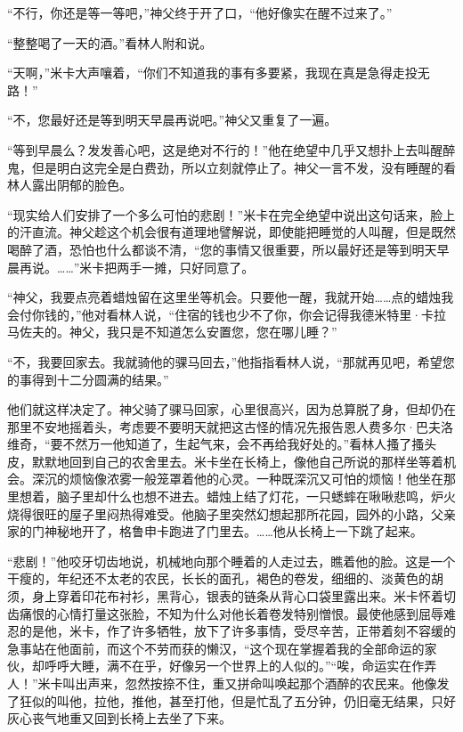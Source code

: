 \par “不行，你还是等一等吧，”神父终于开了口，“他好像实在醒不过来了。”
\par “整整喝了一天的酒。”看林人附和说。
\par “天啊，”米卡大声嚷着，“你们不知道我的事有多要紧，我现在真是急得走投无路！”
\par “不，您最好还是等到明天早晨再说吧。”神父又重复了一遍。
\par “等到早晨么？发发善心吧，这是绝对不行的！”他在绝望中几乎又想扑上去叫醒醉鬼，但是明白这完全是白费劲，所以立刻就停止了。神父一言不发，没有睡醒的看林人露出阴郁的脸色。
\par “现实给人们安排了一个多么可怕的悲剧！”米卡在完全绝望中说出这句话来，脸上的汗直流。神父趁这个机会很有道理地譬解说，即使能把睡觉的人叫醒，但是既然喝醉了酒，恐怕也什么都谈不清，“您的事情又很重要，所以最好还是等到明天早晨再说。……”米卡把两手一摊，只好同意了。
\par “神父，我要点亮着蜡烛留在这里坐等机会。只要他一醒，我就开始……点的蜡烛我会付你钱的，”他对看林人说，“住宿的钱也少不了你，你会记得我德米特里·卡拉马佐夫的。神父，我只是不知道怎么安置您，您在哪儿睡？”
\par “不，我要回家去。我就骑他的骒马回去，”他指指看林人说，“那就再见吧，希望您的事得到十二分圆满的结果。”
\par 他们就这样决定了。神父骑了骒马回家，心里很高兴，因为总算脱了身，但却仍在那里不安地摇着头，考虑要不要明天就把这古怪的情况先报告恩人费多尔·巴夫洛维奇，“要不然万一他知道了，生起气来，会不再给我好处的。”看林人搔了搔头皮，默默地回到自己的农舍里去。米卡坐在长椅上，像他自己所说的那样坐等着机会。深沉的烦恼像浓雾一般笼罩着他的心灵。一种既深沉又可怕的烦恼！他坐在那里想着，脑子里却什么也想不进去。蜡烛上结了灯花，一只蟋蟀在啾啾悲鸣，炉火烧得很旺的屋子里闷热得难受。他脑子里突然幻想起那所花园，园外的小路，父亲家的门神秘地开了，格鲁申卡跑进了门里去。……他从长椅上一下跳了起来。
\par “悲剧！”他咬牙切齿地说，机械地向那个睡着的人走过去，瞧着他的脸。这是一个干瘦的，年纪还不太老的农民，长长的面孔，褐色的卷发，细细的、淡黄色的胡须，身上穿着印花布衬衫，黑背心，银表的链条从背心口袋里露出来。米卡怀着切齿痛恨的心情打量这张脸，不知为什么对他长着卷发特别憎恨。最使他感到屈辱难忍的是他，米卡，作了许多牺牲，放下了许多事情，受尽辛苦，正带着刻不容缓的急事站在他面前，而这个不劳而获的懒汉，“这个现在掌握着我的全部命运的家伙，却呼呼大睡，满不在乎，好像另一个世界上的人似的。”“唉，命运实在作弄人！”米卡叫出声来，忽然按捺不住，重又拼命叫唤起那个酒醉的农民来。他像发了狂似的叫他，拉他，推他，甚至打他，但是忙乱了五分钟，仍旧毫无结果，只好灰心丧气地重又回到长椅上去坐了下来。
